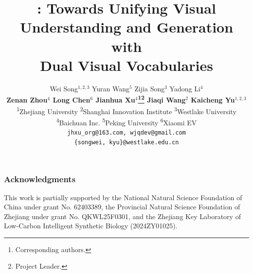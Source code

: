 \documentclass{article} %
\title{\ours: Towards Unifying Visual\\Understanding and Generation with\\Dual Visual Vocabularies}
\author{Wei Song$^{1,2,3}$\enskip
    Yuran Wang$^{5}$\enskip
    Zijia Song$^{3}$\enskip
    Yadong Li$^{4}$\\[0.05ex]
    \textbf{Zenan Zhou$^{4}$\enskip
    Long Chen$^{6}$\enskip
    Jianhua Xu$^{4}$\thanks{Corresponding authors.}\enskip\thanks{Project Leader.}\enskip\enskip
    Jiaqi Wang$^{2}$\footnotemark[1]\enskip\enskip
    Kaicheng Yu$^{1,2,3}$\footnotemark[1]
    }\\[.4ex]
    \normalsize \textsuperscript{1}Zhejiang University\enskip
    \textsuperscript{2}Shanghai Innovation Institute\enskip 
    \textsuperscript{3}Westlake University\enskip\\[0.05ex]
    \normalsize \textsuperscript{4}Baichuan Inc.\enskip
    \textsuperscript{5}Peking University\enskip
    \textsuperscript{6}Xiaomi EV\\[.4ex]
    \texttt{jhxu\_org@163.com, wjqdev@gmail.com}\\
    \texttt{\{songwei, kyu\}@westlake.edu.cn}
}
\begin{document}
\maketitle

    






\subsubsection*{Acknowledgments}
This work is partially supported by the National Natural Science Foundation of China under grant No. 62403389, the Provincial Natural Science Foundation of Zhejiang under grant No. QKWL25F0301, and the Zhejiang Key Laboratory of Low-Carbon Intelligent Synthetic Biology (2024ZY01025).





\end{document}
